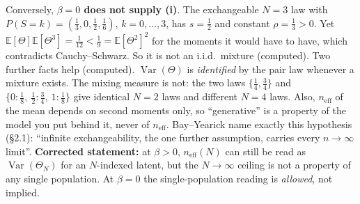 \documentclass[11pt]{article}
\newcommand{\E}{\mathbb{E}}
\newcommand{\Var}{\operatorname{Var}}
\begin{document}
Conversely, \textbf{$\beta=0$ does not supply (i)}. The exchangeable $N=3$ law with $P(S=k)=(\tfrac13,0,\tfrac12,\tfrac16)$, $k=0,\dots,3$, has $s=\tfrac12$ and constant $\rho=\tfrac13>0$. Yet $\E[\Theta]\E[\Theta^3]=\tfrac1{12}<\tfrac19=\E[\Theta^2]^2$ for the moments it would have to have, which contradicts Cauchy--Schwarz. So it is not an i.i.d.\ mixture (computed).
Two further facts help (computed). $\Var(\Theta)$ is \emph{identified} by the pair law whenever a mixture exists. The mixing measure is not: the two laws $\{\tfrac14,\tfrac34\}$ and $\{0{:}\tfrac18,\ \tfrac12{:}\tfrac34,\ 1{:}\tfrac18\}$ give identical $N=2$ laws and different $N=4$ laws. Also, $n_{\mathrm{eff}}$ of the mean depends on second moments only, so ``generative'' is a property of the model you put behind it, never of $n_{\mathrm{eff}}$. Bay--Yearick name exactly this hypothesis (\S2.1): ``infinite exchangeability, the one further assumption, carries every $n\to\infty$ limit''.
\textbf{Corrected statement:} at $\beta>0$, $n_{\mathrm{eff}}(N)$ can still be read as $\Var(\Theta_N)$ for an $N$-indexed latent, but the $N\to\infty$ ceiling is not a property of any single population. At $\beta=0$ the single-population reading is \emph{allowed}, not implied.
\end{document}
